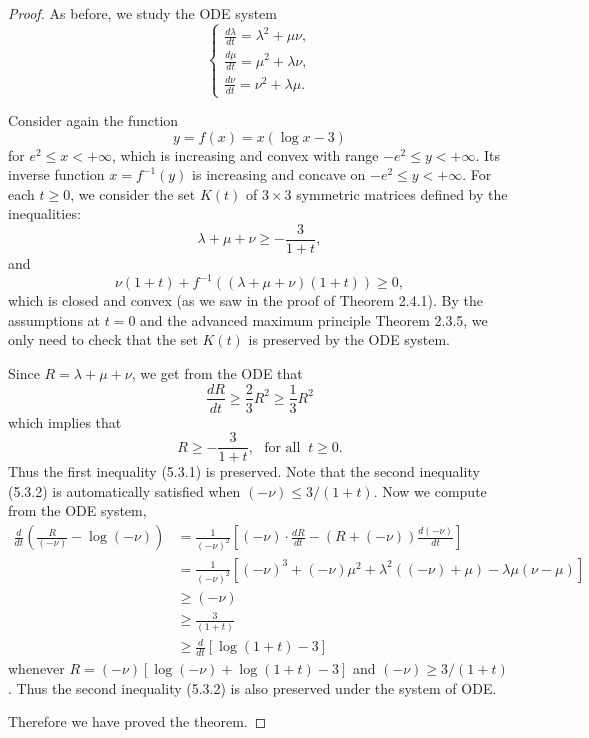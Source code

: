 \begin{proof}
As before, we study the ODE system
\begin{equation*}
\begin{cases}{\displaystyle
    \frac{d\lambda}{dt} =\lambda^2+\mu\nu,}\\[3mm]
{\displaystyle \frac{d\mu}{dt} =\mu^2+\lambda\nu,}\\[3mm]
{\displaystyle \frac{d\nu}{dt} =\nu^2+\lambda\mu.}
\end{cases}
\end{equation*}

Consider again the function $$y=f(x)=x(\log x-3)$$ for $e^2\leq
x<+\infty$, which is increasing and convex with range $-e^2\leq
y<+\infty$. Its inverse function $x=f^{-1}(y)$ is increasing and
concave on $-e^2\leq y<+\infty$. For each $t\geq0$, we consider
the set $K(t)$ of $3\times3$ symmetric matrices defined by the
inequalities: \begin{equation}
\lambda+\mu+\nu \geq-\frac{3}{1+t}, %
\end{equation} and \begin{equation}
\nu(1+t)+f^{-1}((\lambda+\mu+\nu)(1+t))\geq0, %
\end{equation} which is closed and convex (as we saw in the proof of Theorem
2.4.1). By the assumptions at $t=0$ and the advanced maximum
principle Theorem 2.3.5, we only need to check that the set $K(t)$
is preserved by the ODE system.

Since $R=\lambda+\mu+\nu$, we get from the ODE that
$$
\frac{dR}{dt}\geq\frac{2}{3}R^2\geq\frac{1}{3}R^2
$$
which implies that
$$
R\geq-\frac{3}{1+t},\ \ \ \text{for\ all }\ t\geq0.
$$
Thus the first inequality (5.3.1) is preserved. Note that the
second inequality (5.3.2) is automatically satisfied when $(-\nu)
\leq 3/(1+t)$. Now we compute from the ODE system,
\begin{displaymath}
\begin{split}
\frac{d}{dt}(\frac{R}{(-\nu)}-\log(-\nu))&  =\frac{1}{(-\nu)^2}
\left[(-\nu)\cdot\frac{dR}{dt}-(R+(-\nu))\frac{d(-\nu)}{dt}\right]\\[1mm]
&  =\frac{1}{(-\nu)^2}[(-\nu)^3+(-\nu)\mu^2+\lambda^2((-\nu)+\mu)
-\lambda\mu(\nu-\mu)]\\[1mm]
&  \geq(-\nu)\\[3mm]
&  \geq\frac{3}{(1+t)}\\[1mm]
&  \geq\frac{d}{dt}[\log(1+t)-3]
\end{split}
\end{displaymath}
whenever $R=(-\nu)[\log(-\nu)+\log(1+t)-3]$ and
$(-\nu)\geq3/(1+t)$. Thus the second inequality (5.3.2) is also
preserved under the system of ODE.

Therefore we have proved the theorem.
\end{proof}

